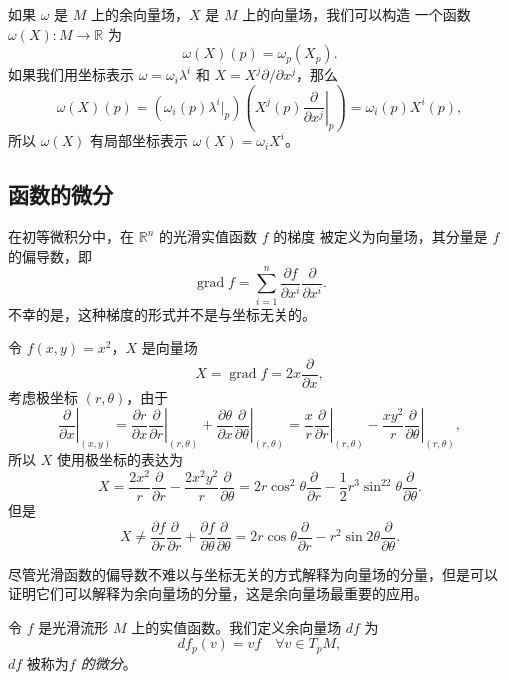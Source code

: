 \documentclass[fontset=none]{Notes}
\DeclareMathOperator\grad{grad}
\begin{document}
如果 $\omega$ 是 $M$ 上的余向量场，$X$ 是 $M$ 上的向量场，我们可以构造
一个函数 $\omega(X):M\to \mathbb{R}$ 为
\[
  \omega(X)(p)=\omega_p(X_p).  
\]
如果我们用坐标表示 $\omega=\omega_i\lambda^i$ 和 $X=X^j\partial/\partial x^j$，那么
\[
  \omega(X)(p)=\left(\omega_i(p)\lambda^i|_p\right) 
  \left(X^j(p)\left.\frac{\partial}{\partial x^j}\right|_p\right)
  =\omega_i(p)X^i(p),
\]
所以 $\omega(X)$ 有局部坐标表示 $\omega(X)=\omega_iX^i$。


\subsection{函数的微分}

在初等微积分中，在 $\mathbb{R}^n$ 的光滑实值函数 $f$ 的梯度
被定义为向量场，其分量是 $f$ 的偏导数，即
\begin{equation}
  \grad f= \sum_{i=1}^n\frac{\partial f}{\partial x^i}\frac{\partial}{\partial x^i}.
\end{equation}
不幸的是，这种梯度的形式并不是与坐标无关的。

\begin{example}
  令 $f(x,y)=x^2$，$X$ 是向量场
  \[
    X=\grad f=2x\frac{\partial}{\partial x},  
  \]
  考虑极坐标 $(r,\theta)$，由于
  \[
    \left.\frac{\partial}{\partial x}\right|_{(x,y)} 
    =\frac{\partial r}{\partial x}\left.\frac{\partial}{\partial r}\right|_{(r,\theta)} 
    +\frac{\partial \theta}{\partial x}\left.\frac{\partial}{\partial \theta}\right|_{(r,\theta)} 
    =\frac{x}{r}\left.\frac{\partial}{\partial r}\right|_{(r,\theta)} 
    -\frac{xy^2}{r}\left.\frac{\partial}{\partial \theta}\right|_{(r,\theta)},
  \]
  所以 $X$ 使用极坐标的表达为
  \[
    X=  \frac{2x^2}{r}\frac{\partial}{\partial r}
    -\frac{2x^2y^2}{r}\frac{\partial}{\partial \theta}
    =2r\cos^2\theta\frac{\partial}{\partial r}-
    \frac{1}{2}r^3\sin^22\theta\frac{\partial}{\partial \theta}.
  \]
  但是
  \[
    X\neq \frac{\partial f}{\partial r}\frac{\partial}{\partial r}
    +\frac{\partial f}{\partial\theta}\frac{\partial}{\partial \theta}
    =2r\cos\theta  \frac{\partial}{\partial r}-r^2\sin 2\theta
    \frac{\partial}{\partial \theta}.
  \]
\end{example}

尽管光滑函数的偏导数不难以与坐标无关的方式解释为向量场的分量，但是可以
证明它们可以解释为余向量场的分量，这是余向量场最重要的应用。

令 $f$ 是光滑流形 $M$ 上的实值函数。我们定义余向量场 $df$ 为
\[
  df_p(v)=vf\quad \forall v\in T_pM,  
\]
$df$ 被称为\emph{$f$ 的微分}。
\end{document}
